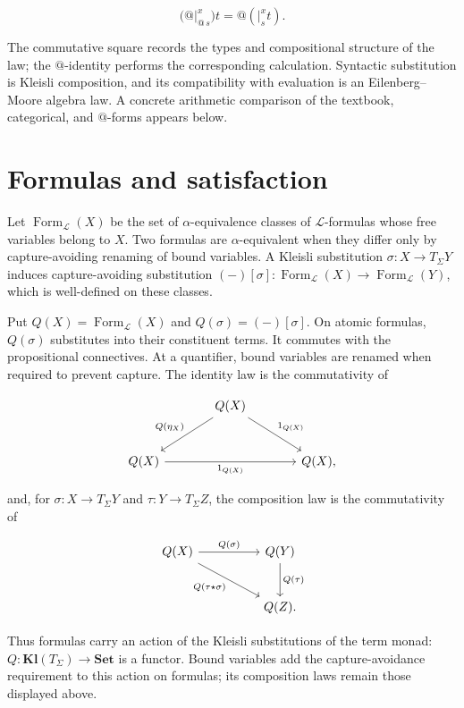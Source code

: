 \documentclass[11pt]{article}
\makeatletter
\newcommand{\atsign}{\mathord{@}}
\theoremstyle{definition}
\makeatother
\begin{document}
\[
\boxed{
\bigl(\atsign\vert_{\atsign\,s}^x\bigr)t
=\atsign(\vert_s^x t).
}
\]

The commutative square records the types and compositional structure of the
law; the \(\atsign\)-identity performs the corresponding calculation.
Syntactic substitution is Kleisli composition, and its compatibility with
evaluation is an Eilenberg--Moore algebra law. A concrete arithmetic comparison
of the textbook, categorical, and \(\atsign\)-forms appears below.

\section{Formulas and satisfaction}\label{formulas-and-satisfaction}

Let \(\operatorname{Form}_{\mathcal L}(X)\) be the set of
\(\alpha\)-equivalence classes of \(\mathcal L\)-formulas whose free
variables belong to \(X\). Two formulas are \(\alpha\)-equivalent when they
differ only by capture-avoiding renaming of bound variables. A Kleisli substitution
\(\sigma:X\to T_\Sigma Y\) induces capture-avoiding substitution
\((-)[\sigma]:\operatorname{Form}_{\mathcal L}(X)
\to\operatorname{Form}_{\mathcal L}(Y)\), which is well-defined on these
classes.

Put \(Q(X)=\operatorname{Form}_{\mathcal L}(X)\) and
\(Q(\sigma)=(-)[\sigma]\). On atomic formulas, \(Q(\sigma)\) substitutes
into their constituent terms. It commutes with the propositional connectives.
At a quantifier, bound variables are renamed when required to prevent capture.
The identity law is the commutativity of

\[
\begin{tikzcd}[row sep=large,column sep=large]
& Q(X) \arrow[dl,"Q(\eta_X)"'] \arrow[dr,"1_{Q(X)}"] & \\
Q(X) \arrow[rr,"1_{Q(X)}"'] && Q(X),
\end{tikzcd}
\]

and, for \(\sigma:X\to T_\Sigma Y\) and
\(\tau:Y\to T_\Sigma Z\), the composition law is the commutativity of

\[
\begin{tikzcd}[row sep=large,column sep=huge]
Q(X) \arrow[r,"Q(\sigma)"] \arrow[dr,"Q(\tau\star\sigma)"'] &
Q(Y) \arrow[d,"Q(\tau)"] \\
& Q(Z).
\end{tikzcd}
\]

Thus formulas carry an action of the Kleisli substitutions of the term
monad: \(Q:\mathbf{Kl}(T_\Sigma)\to\mathbf{Set}\) is a functor. Bound
variables add the capture-avoidance requirement to this action on formulas;
its composition laws remain those displayed above.
\end{document}
